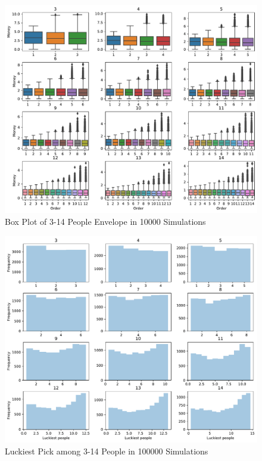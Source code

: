 \documentclass{scrartcl}
\begin{document}
\begin{figure}[H]
	\begin{center}
		\includegraphics[width=16cm]{boxplot_3-14people10000simulation.pdf}
	\end{center}
	\caption{Box Plot of 3-14 People Envelope in 10000 Simulations}
	\label{box}
\end{figure}
\begin{figure}[H]
	\begin{center}
		\includegraphics[width=16cm]{luckiest3-14people10000simulation.pdf}
	\end{center}
	\caption{Luckiest Pick among 3-14 People in 100000 Simulations  }
	\label{luck3}
\end{figure}
\end{document}
